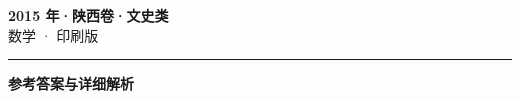 \documentclass[zihao=5, a4paper]{ctexart}
\begin{document}
\begin{center}
  {\Large\bfseries 2015 年·陕西卷·文史类}\\[4pt]
  {\large 数学 · 印刷版}
\end{center}
\medskip
{}

\par\bigskip\hrule\bigskip
{}
\begin{center}{\large\bfseries 参考答案与详细解析}\end{center}
\smallskip

\end{document}
